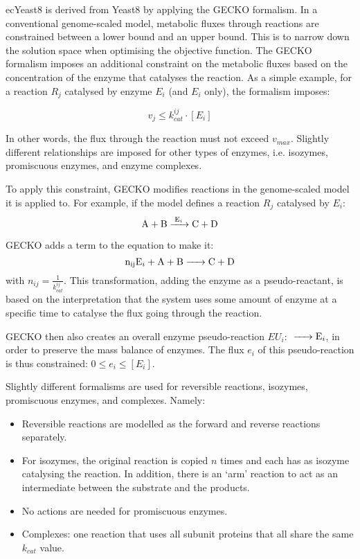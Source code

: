 ecYeast8 is derived from Yeast8 by applying the GECKO formalism.
In a conventional genome-scaled model, metabolic fluxes through reactions are constrained between a lower bound and an upper bound.
This is to narrow down the solution space when optimising the objective function.
The GECKO formalism imposes an additional constraint on the metabolic fluxes based on the concentration of the enzyme that catalyses the reaction.
As a simple example, for a reaction $R_{j}$ catalysed by enzyme $E_{i}$ (and $E_{i}$ only), the formalism imposes:

\begin{equation}
  v_{j} \le k_{cat}^{ij} \cdot [E_{i}]
\end{equation}

In other words, the flux through the reaction must not exceed $v_{max}$.
Slightly different relationships are imposed for other types of enzymes, i.e. isozymes, promiscuous enzymes, and enzyme complexes.

To apply this constraint, GECKO modifies reactions in the genome-scaled model it is applied to.
For example, if the model defines a reaction $R_{j}$ catalysed by $E_{i}$:
\begin{equation}
  \ce{ A + B ->[E_{i}] C + D }
\end{equation}

GECKO adds a term to the equation to make it:
\begin{equation}
  \ce{ n_{ij}E_{i} + A + B -> C + D }
\end{equation}
with $n_{ij} = \frac{1}{k_{cat}^{ij}}$.
This transformation, adding the enzyme as a pseudo-reactant, is based on the interpretation that the system uses some amount of enzyme at a specific time to catalyse the flux going through the reaction.

GECKO then also creates an overall enzyme pseudo-reaction $EU_{i}$: $\ce{ -> E_{i}}$, in order to preserve the mass balance of enzymes.  The flux $e_{i}$ of this pseudo-reaction is thus constrained: $0 \le e_{i} \le [E_{i}]$.

Slightly different formalisms are used for reversible reactions, isozymes, promiscuous enzymes, and complexes.  Namely:
\begin{itemize}
  \item Reversible reactions are modelled as the forward and reverse reactions separately.
  \item For isozymes, the original reaction is copied $n$ times and each has as isozyme catalysing the reaction.
  In addition, there is an `arm' reaction to act as an intermediate between the substrate and the products.
  \item No actions are needed for promiscuous enzymes.
  \item Complexes: one reaction that uses all subunit proteins that all share the same $k_{cat}$ value.
\end{itemize}

